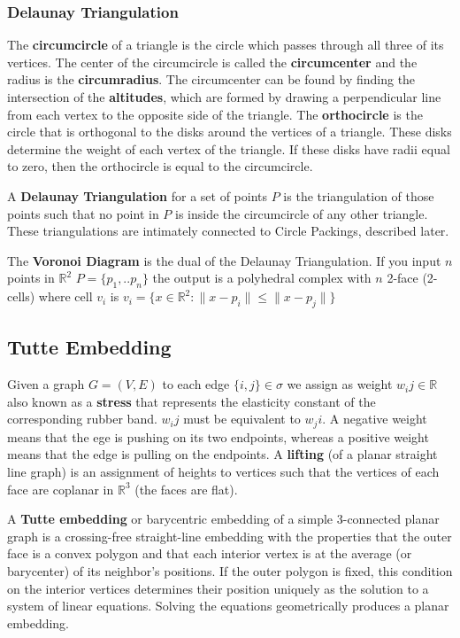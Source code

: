 \documentclass[english]{article}
\newcommand{\R}{\mathbb{R}}
\begin{document}
  \subsubsection{Delaunay Triangulation}
  The \textbf{circumcircle} of a triangle is the circle which passes through all three of its vertices. The center of the circumcircle is called the \textbf{circumcenter} and the radius is the \textbf{circumradius}. The circumcenter can be found by finding the intersection of the \textbf{altitudes}, which are formed by drawing a perpendicular line from each vertex to the opposite side of the triangle. The \textbf{orthocircle} is the circle that is orthogonal to the disks around the vertices of a triangle. These disks determine the weight of each vertex of the triangle. If these disks have radii equal to zero, then the orthocircle is equal to the circumcircle.
  
  A \textbf{Delaunay Triangulation} for a set of points $P$ is the triangulation of those points such that no point in $P$ is inside the circumcircle of any other triangle. These triangulations are intimately connected to Circle Packings, described later.
  
  The \textbf{Voronoi Diagram} is the dual of the Delaunay Triangulation. If you input $n$ points in $\R^2$ $P=\{p_1,..p_n\}$ the output is a polyhedral complex with $n$ 2-face (2-cells) where cell $v_i$ is $v_i = \{x \in \R^2 : \| x - p_i \| \leq \| x - p_j\|\}$
 
 \subsection{Tutte Embedding}
   Given a graph $G=(V,E)$ to each edge $\{i,j\}\in\sigma$ we assign as weight $w_ij\in\R$ also known as a \textbf{stress} that represents the elasticity constant of the corresponding rubber band. $w_ij$ must be equivalent to $w_ji$. A negative weight means that the ege is pushing on its two endpoints, whereas a positive weight means that the edge is pulling on the endpoints. 
 A \textbf{lifting} (of a planar straight line graph) is an assignment of heights to vertices such that the vertices of each face are coplanar in $\R^3$ (the faces are flat).
  
  A \textbf{Tutte embedding} or barycentric embedding of a simple 3-connected planar graph is a crossing-free straight-line embedding with the properties that the outer face is a convex polygon and that each interior vertex is at the average (or barycenter) of its neighbor's positions. If the outer polygon is fixed, this condition on the interior vertices determines their position uniquely as the solution to a system of linear equations. Solving the equations geometrically produces a planar embedding. 
  
\end{document}

